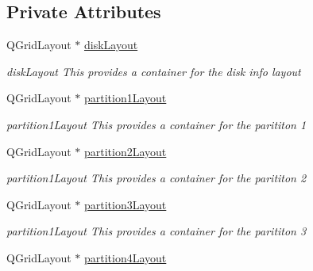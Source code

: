 \subsection*{Private Attributes}
\begin{DoxyCompactItemize}
\item 
\mbox{\label{class_disk_info_a4f29d2b2ca7159d49095f6263f57b025}} 
Q\+Grid\+Layout $\ast$ \mbox{\hyperlink{class_disk_info_a4f29d2b2ca7159d49095f6263f57b025}{disk\+Layout}}
\begin{DoxyCompactList}\small\item\em disk\+Layout This provides a container for the disk info layout \end{DoxyCompactList}\item 
\mbox{\label{class_disk_info_acc969f364b1de6633d223c830d9462a2}} 
Q\+Grid\+Layout $\ast$ \mbox{\hyperlink{class_disk_info_acc969f364b1de6633d223c830d9462a2}{partition1\+Layout}}
\begin{DoxyCompactList}\small\item\em partition1\+Layout This provides a container for the parititon 1 \end{DoxyCompactList}\item 
\mbox{\label{class_disk_info_a538d5e9d2d6c23659ee5fd2d2725cf16}} 
Q\+Grid\+Layout $\ast$ \mbox{\hyperlink{class_disk_info_a538d5e9d2d6c23659ee5fd2d2725cf16}{partition2\+Layout}}
\begin{DoxyCompactList}\small\item\em partition1\+Layout This provides a container for the parititon 2 \end{DoxyCompactList}\item 
\mbox{\label{class_disk_info_af9c6f66539334425bdce193d271730d8}} 
Q\+Grid\+Layout $\ast$ \mbox{\hyperlink{class_disk_info_af9c6f66539334425bdce193d271730d8}{partition3\+Layout}}
\begin{DoxyCompactList}\small\item\em partition1\+Layout This provides a container for the parititon 3 \end{DoxyCompactList}\item 
\mbox{\label{class_disk_info_a506bd9f47384b1290a51ba11f3106d92}} 
Q\+Grid\+Layout $\ast$ \mbox{\hyperlink{class_disk_info_a506bd9f47384b1290a51ba11f3106d92}{partition4\+Layout}}

\end{DoxyCompactItemize}

